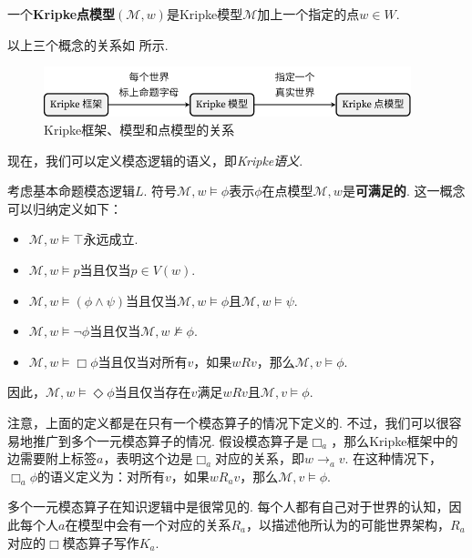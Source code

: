 \begin{definition}[Kripke点模型]
一个\textbf{Kripke点模型}$(\mathcal{M},w)$是Kripke模型$\mathcal M$加上一个指定的点$w\in W$. 
\end{definition}

以上三个概念的关系如 所示.

\begin{figure}[ht]
\centering
\includegraphics[width=0.95\textwidth]{figures/modal-logic/Kripke-frame-model-point-model.pdf}
\caption{Kripke框架、模型和点模型的关系}\label{fig:kripke-frame-model-point-model}
\end{figure}

现在，我们可以定义模态逻辑的语义，即\textit{Kripke语义}. 

\begin{definition}[Kripke语义]
考虑基本命题模态逻辑$L$. 符号$\mathcal M,w\vDash\phi$表示$\phi$在点模型$\mathcal M,w$是\textbf{可满足的}. 这一概念可以归纳定义如下：
\begin{itemize}
\item $\mathcal M, w\vDash\top$永远成立. 
\item $\mathcal M, w\vDash p$当且仅当$p\in V(w)$. 
\item $\mathcal M, w\vDash (\phi\wedge\psi)$当且仅当$\mathcal M,w\vDash\phi$且$\mathcal M,w\vDash\psi$. 
\item $\mathcal M, w\vDash \neg\phi$当且仅当$\mathcal M,w\not\vDash\phi$. 
\item $\mathcal M, w\vDash \Box\phi$当且仅当对所有$v$，如果$wRv$，那么$\mathcal M,v\vDash\phi$. 
\end{itemize}
因此，$\mathcal M, w\vDash \Diamond\phi$当且仅当存在$v$满足$wRv$且$\mathcal M,v\vDash\phi$. 
\end{definition}

注意，上面的定义都是在只有一个模态算子的情况下定义的. 不过，我们可以很容易地推广到多个一元模态算子的情况. 假设模态算子是$\Box_a$，那么Kripke框架中的边需要附上标签$a$，表明这个边是$\Box_a$对应的关系，即$w\to_a v$. 在这种情况下，$\Box_a\phi$的语义定义为：对所有$v$，如果$wR_av$，那么$\mathcal M,v\vDash\phi$. 

多个一元模态算子在知识逻辑中是很常见的. 每个人都有自己对于世界的认知，因此每个人$a$在模型中会有一个对应的关系$R_a$，以描述他所认为的可能世界架构，$R_a$对应的$\Box$模态算子写作$K_a$. 

